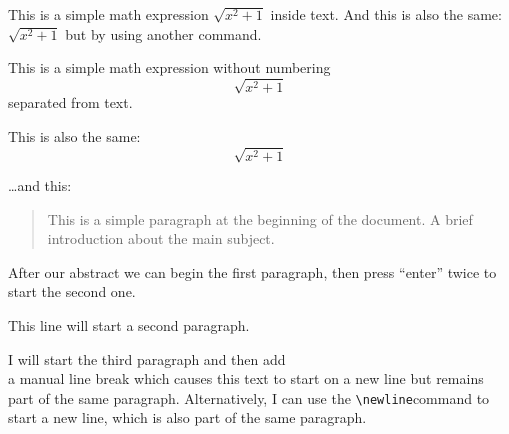 \documentclass[11pt,a4paper]{article}
\begin{document}
This is a simple math expression \(\sqrt{x^2+1}\) inside text.
And this is also the same:
\begin{math}
    \sqrt{x^2+1}
\end{math}
but by using another command.

This is a simple math expression without numbering
\[\sqrt{x^2+1}\]
separated from text.

This is also the same:
\begin{displaymath}
    \sqrt{x^2+1}
\end{displaymath}

\ldots and this:



\begin{abstract}
    This is a simple paragraph at the beginning of the
    document. A brief introduction about the main subject.
\end{abstract}

After our abstract we can begin the first paragraph, then press ``enter'' twice to start the second one.

This line will start a second paragraph.

I will start the third paragraph and then add \\ a manual line break which causes this text to start on a new line but remains part of the same paragraph. Alternatively, I can use the \verb|\newline|\newline command to start a new line, which is also part of the same paragraph.
\end{document}
